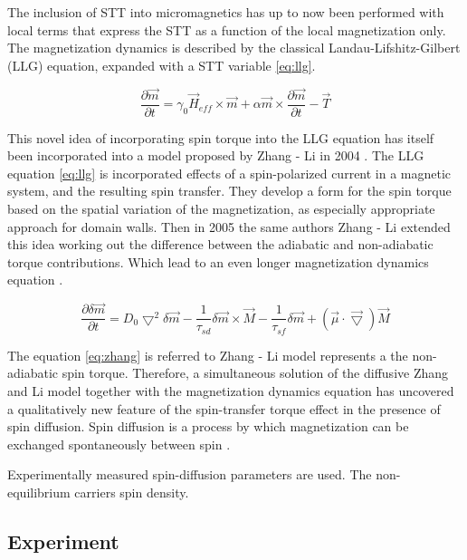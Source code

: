 The inclusion of STT into micromagnetics has up to now been performed with local terms that express the STT as a function of the local magnetization only. The magnetization dynamics is described by the classical Landau-Lifshitz-Gilbert (LLG) equation, expanded with a STT variable \ref{eq:llg}.

\begin{equation}  \label{eq:llg}
	\frac{\partial \vec{m}}{\partial t} = \gamma_0\vec{H}_{eff} \times \vec{m} + \alpha \vec{m} \times \frac{\partial \vec{m}}{\partial t} - \vec{T}
\end{equation}

This novel idea of incorporating spin torque into the LLG equation has itself been incorporated into a model proposed by Zhang - Li in 2004 \cite{zhang2004}. The LLG equation \ref{eq:llg} is incorporated effects of a spin-polarized current in a magnetic system, and the resulting spin transfer. They develop a form for the spin torque based on the spatial variation of the magnetization, as especially appropriate approach for domain walls. Then in 2005 the same authors Zhang - Li extended this idea working out the difference between the adiabatic and non-adiabatic torque contributions. Which lead to an even longer magnetization dynamics equation \cite{zhang} \cite{spindomain}.

\begin{equation} \label{eq:zhang}
 \frac{\partial \delta \vec{m} }{\partial t} =  D_{0}\bigtriangledown^{2} \delta \vec{m} - \frac{1}{\tau_{sd}} \delta \vec{m} \times \vec{M} - \frac{1}{\tau_{sf}}\delta \vec{m} +(\vec{\mu} \cdot\vec{\bigtriangledown} )\vec{M}
\end{equation}

The equation \ref{eq:zhang} is referred to Zhang - Li model  represents a the non-adiabatic spin torque. Therefore, a simultaneous solution of the diffusive Zhang and Li model together with the magnetization dynamics equation has uncovered a qualitatively new feature of the spin-transfer torque effect in the presence of spin diffusion. Spin diffusion is a process by which magnetization can be exchanged spontaneously between spin \cite{claudio}.


Experimentally measured spin-diffusion parameters are used. The non-equilibrium carriers spin density.


\subsection{Experiment}

